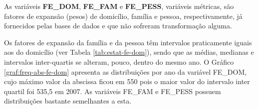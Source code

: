 \begin{table}[htb]
\centering

\end{table}

As variáveis \textbf{FE_DOM}, \textbf{FE_FAM} e \textbf{FE_PESS}, variáveis métricas, são fatores de expansão (pesos) de domicílio, família e pessoa, respectivamente, já fornecidos pelas bases de dados e que não sofreram transformação alguma.

Os fatores de expansão da família e da pessoa têm intervalos praticamente iguais aos do domicílio (ver Tabela \ref{tab:estat-fe-dom}), sendo que as médias, medianas e intervalos inter-quartis se alteram, pouco, dentro do mesmo ano.
O Gráfico \ref{graf:freq-abs-fe-dom} apresenta as distribuições por ano da variável FE_DOM, cujo máximo valor da abscissa ficou em 550 pois o maior valor do intervalo inter quartil foi 535,5 em 2007. As variáveis FE_FAM e FE_PESS possuem distribuições bastante semelhantes a esta.


